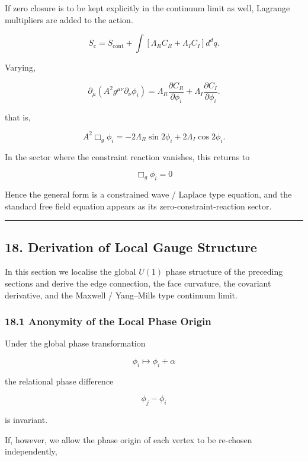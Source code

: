 \documentclass[
  a4paper,
]{article}
\begin{document}
If zero closure is to be kept explicitly in the continuum limit as well,
Lagrange multipliers are added to the action.

\[
\boxed{
S_{\mathrm{c}}
=
S_{\mathrm{cont}}
+
\int
\left[
\Lambda_R C_R
+
\Lambda_I C_I
\right]
d^dq.
}
\tag{63}
\]

Varying,

\[
\boxed{
\partial_\mu
\left(
A^2g^{\mu\nu}\partial_\nu\phi_i
\right)
=
\Lambda_R
\frac{\partial C_R}{\partial\phi_i}
+
\Lambda_I
\frac{\partial C_I}{\partial\phi_i}.
}
\tag{64}
\]

that is,

\[
\boxed{
A^2\Box_g\phi_i
=
-2\Lambda_R\sin2\phi_i
+
2\Lambda_I\cos2\phi_i.
}
\tag{65}
\]

In the sector where the constraint reaction vanishes, this returns to

\[
\boxed{
\Box_g\phi_i=0
}
\tag{66}
\]

Hence the general form is a constrained wave / Laplace type equation,
and the standard free field equation appears as its
zero-constraint-reaction sector.

\begin{center}\rule{0.5\linewidth}{0.5pt}\end{center}

\subsection{18. Derivation of Local Gauge
Structure}\label{derivation-of-local-gauge-structure}

In this section we localise the global \(U(1)\) phase structure of the
preceding sections and derive the edge connection, the face curvature,
the covariant derivative, and the Maxwell / Yang--Mills type continuum
limit.

\subsubsection{18.1 Anonymity of the Local Phase
Origin}\label{anonymity-of-the-local-phase-origin}

Under the global phase transformation

\[
\phi_i\mapsto\phi_i+\alpha
\]

the relational phase difference

\[
\phi_j-\phi_i
\]

is invariant.

If, however, we allow the phase origin of each vertex to be re-chosen
independently,
\end{document}
